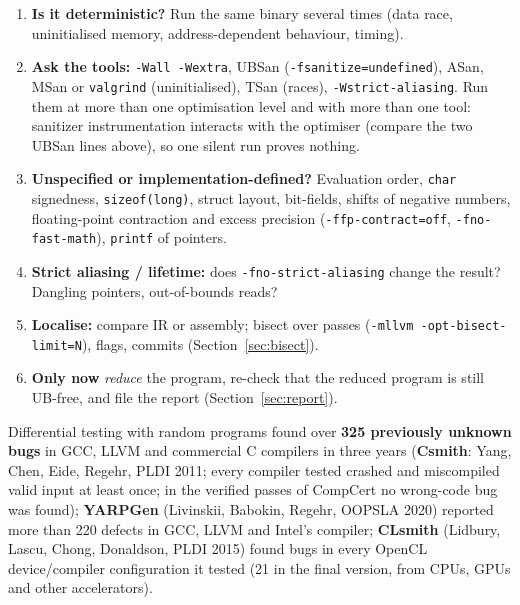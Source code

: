 \documentclass[10pt,a4paper,openany,oneside]{report}
\begin{document}
\begin{mustbox}
\begin{enumerate}[nosep]
\item \textbf{Is it deterministic?} Run the same binary several times (data race, uninitialised memory, address-dependent behaviour, timing).
\item \textbf{Ask the tools:} \texttt{-Wall -Wextra}, UBSan (\texttt{-fsanitize=undefined}), ASan, MSan or \texttt{valgrind} (uninitialised), TSan (races), \texttt{-Wstrict-aliasing}. Run them at more than one optimisation level and with more than one tool: sanitizer instrumentation interacts with the optimiser (compare the two UBSan lines above), so one silent run proves nothing.
\item \textbf{Unspecified or implementation-defined?} Evaluation order, \texttt{char} signedness, \texttt{sizeof(long)}, struct layout, bit-fields, shifts of negative numbers, floating-point contraction and excess precision (\texttt{-ffp-contract=off}, \texttt{-fno-fast-math}), \texttt{printf} of pointers.
\item \textbf{Strict aliasing / lifetime:} does \texttt{-fno-strict-aliasing} change the result? Dangling pointers, out-of-bounds reads?
\item \textbf{Localise:} compare IR or assembly; bisect over passes (\texttt{-mllvm -opt-bisect-limit=N}), flags, commits (Section~\ref{sec:bisect}).
\item \textbf{Only now} \emph{reduce} the program, re-check that the reduced program is still UB-free, and file the report (Section~\ref{sec:report}).
\end{enumerate}
\end{mustbox}
\begin{srcbox}
Differential testing with random programs found over \textbf{325 previously unknown bugs} in GCC, LLVM and commercial C compilers in three years (\textbf{Csmith}: Yang, Chen, Eide, Regehr, PLDI 2011; every compiler tested crashed and miscompiled valid input at least once; in the verified passes of CompCert no wrong-code bug was found); \textbf{YARPGen} (Livinskii, Babokin, Regehr, OOPSLA 2020) reported more than 220 defects in GCC, LLVM and Intel's compiler; \textbf{CLsmith} (Lidbury, Lascu, Chong, Donaldson, PLDI 2015) found bugs in every OpenCL device/compiler configuration it tested (21 in the final version, from CPUs, GPUs and other accelerators).
\end{srcbox}
\end{document}
